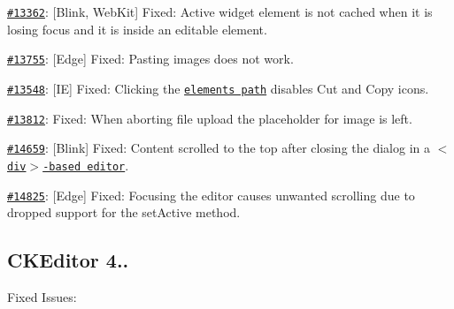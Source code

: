 \begin{DoxyItemize}
\item \href{http://dev.ckeditor.com/ticket/13362}{\tt \#13362}\+: \mbox{[}Blink, Web\+Kit\mbox{]} Fixed\+: Active widget element is not cached when it is losing focus and it is inside an editable element.
\item \href{http://dev.ckeditor.com/ticket/13755}{\tt \#13755}\+: \mbox{[}Edge\mbox{]} Fixed\+: Pasting images does not work.
\item \href{http://dev.ckeditor.com/ticket/13548}{\tt \#13548}\+: \mbox{[}IE\mbox{]} Fixed\+: Clicking the \href{http://ckeditor.com/addon/elementspath}{\tt elements path} disables Cut and Copy icons.
\item \href{http://dev.ckeditor.com/ticket/13812}{\tt \#13812}\+: Fixed\+: When aborting file upload the placeholder for image is left.
\item \href{http://dev.ckeditor.com/ticket/14659}{\tt \#14659}\+: \mbox{[}Blink\mbox{]} Fixed\+: Content scrolled to the top after closing the dialog in a \href{http://ckeditor.com/addon/divarea}{\tt {\ttfamily $<$div$>$}-\/based editor}.
\item \href{http://dev.ckeditor.com/ticket/14825}{\tt \#14825}\+: \mbox{[}Edge\mbox{]} Fixed\+: Focusing the editor causes unwanted scrolling due to dropped support for the {\ttfamily set\+Active} method.
\end{DoxyItemize}

\subsection*{C\+K\+Editor 4..}

Fixed Issues\+:


